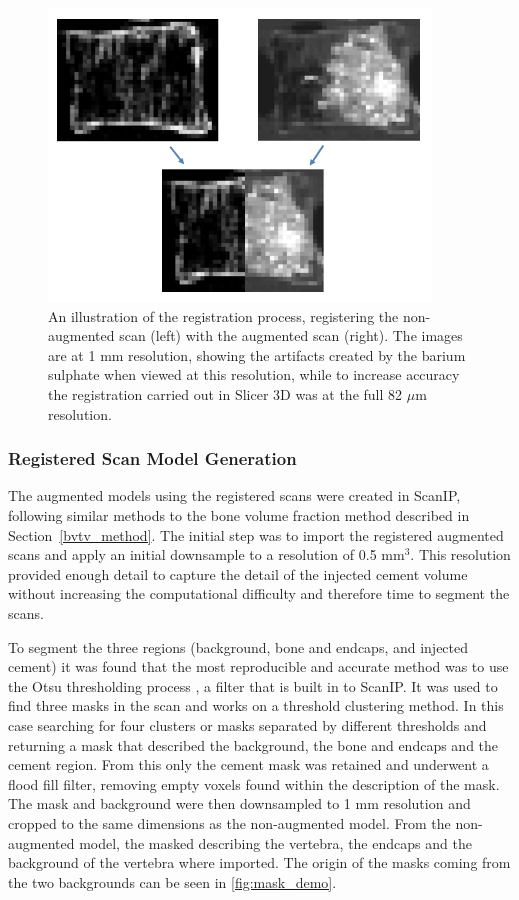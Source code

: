 \begin{figure}[ht!]
  \centering
  \includegraphics[width=4in]{Chapters/Chapter_HT_images/reg_demo.png}
  \caption{An illustration of the registration process, registering the
non-augmented scan (left) with the augmented scan (right). The images are at 1
mm resolution, showing the artifacts created by the barium sulphate when viewed
at this resolution, while to increase accuracy the registration carried out in
Slicer 3D was at the full 82 $\mu$m resolution.}
  \label{fig:reg_demo}
\end{figure}

\subsubsection{Registered Scan Model Generation}

The augmented models using the registered scans were created in ScanIP,
following similar methods to the bone volume fraction method described in
Section~\ref{bvtv_method}.
The initial step was to import the registered augmented scans and apply an
initial downsample to a resolution of 0.5 mm$^3$.
This resolution provided enough detail to capture the detail of the injected
cement volume without increasing the computational difficulty and therefore
time to segment the scans.

To segment the three regions (background, bone and endcaps, and injected
cement) it was found that the most reproducible and accurate method was to use
the Otsu thresholding process \cite{sezgin2004survey}, a filter that is built
in to ScanIP\@.
It was used to find three masks in the scan and works on a threshold clustering
method.
In this case searching for four clusters or masks separated by different
thresholds and returning a mask that described the background, the bone and
endcaps and the cement region.
From this only the cement mask was retained and underwent a flood fill filter,
removing empty voxels found within the description of the mask.
The mask and background were then downsampled to 1 mm resolution and cropped to
the same dimensions as the non-augmented model.
From the non-augmented model, the masked describing the vertebra, the endcaps
and the background of the vertebra where imported.
The origin of the masks coming from the two backgrounds can be seen in
\cref{fig:mask_demo}.

